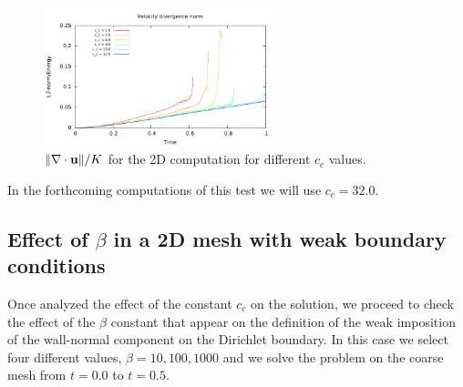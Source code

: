 \begin{figure}[h!]
  \centering
  \includegraphics[width=0.6\textwidth]{Figures/Chapter8/strong/divel}
  \caption{$\|\nabla\cdot{\bf u}\|/K$ for the 2D computation for different $ c_c $ values.}
  \label{fig-NACA_c_c_divel}
\end{figure}
In the forthcoming computations of this test we will use $ c_c=32.0 $.

\subsection{Effect of $ \beta $ in a 2D mesh with weak boundary conditions}
Once analyzed the effect of the constant $ c_c $ on the solution, we proceed to check the effect of the $ \beta $ constant that appear on the definition of the weak imposition of the wall-normal component on the Dirichlet boundary. In this case we select four different values, $ \beta={10,100,1000} $ and we solve the problem on the coarse mesh from $ t=0.0 $ to $ t=0.5 $.

